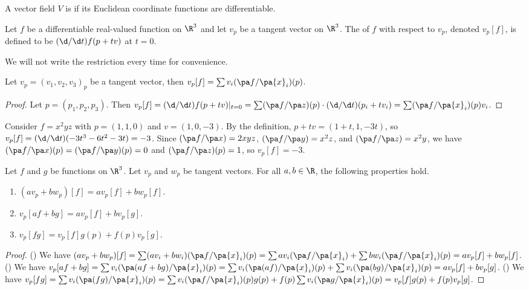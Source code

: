 \documentclass[10pt]{article}
\begin{document}
\begin{definition}
    A vector field $V$ is  if its Euclidean coordinate functions are differentiable.
\end{definition}
\begin{definition}
    Let $f$ be a differentiable real-valued function on ${\R}^{3}$ and let ${v}_{p}$ be a tangent vector on ${\R}^{3}$. The  of $f$ with respect to ${v}_{p}$, denoted ${v}_{p}[f]$, is defined to be $(\d/\d t)f(p+tv)$ at $t=0$.
\end{definition}
\begin{remark}
    We will not write the restriction every time for convenience.
\end{remark}
\begin{proposition}
    Let ${v}_{p}={({v}_{1},{v}_{2},{v}_{3})}_{p}$ be a tangent vector, then ${v}_{p}[f]=\sum{v}_{i}(\pa f/\pa{x}_{i})(p)$.
\end{proposition}
\begin{proof}
    Let $p=({p}_{1},{p}_{2},{p}_{3})$. Then ${v}_{p}[f]=(\d/\d t)f(p+tv){\vert}_{t=0}=\sum(\pa f/\pa z)(p)\cdot(\d/\d t)({p}_{i}+t{v}_{i})=\sum(\pa f/\pa{x}_{i})(p){v}_{i}$.
\end{proof}
\begin{example}
    Consider $f={x}^{2}yz$ with $p=(1,1,0)$ and $v=(1,0,-3)$. By the definition, $p+tv=(1+t,1,-3t)$, so ${v}_{p}[f]=(\d/\d t)(-3{t}^{3}-6{t}^{2}-3t)=-3$. Since $(\pa f/\pa x)=2xyz$, $(\pa f/\pa y)={x}^{2}z$, and $(\pa f/\pa z)={x}^{2}y$, we have $(\pa f/\pa x)(p)=(\pa f/\pa y)(p)=0$ and $(\pa f/\pa z)(p)=1$, so ${v}_{p}[f]=-3$.
\end{example}
\begin{proposition}
    Let $f$ and $g$ be functions on ${\R}^{3}$. Let ${v}_{p}$ and ${w}_{p}$ be tangent vectors. For all $a,b\in\R$, the following properties hold.
    \begin{enumerate}
        \item $(a{v}_{p}+b{w}_{p})[f]=a{v}_{p}[f]+b{w}_{p}[f]$.
        \item ${v}_{p}[af+bg]=a{v}_{p}[f]+b{v}_{p}[g]$.
        \item ${v}_{p}[fg]={v}_{p}[f]g(p)+f(p){v}_{p}[g]$.
    \end{enumerate}
\end{proposition}
\begin{proof}
    () We have $(a{v}_{p}+b{w}_{p})[f]=\sum(a{v}_{i}+b{w}_{i})(\pa f/\pa{x}_{i})(p)=\sum a{v}_{i}(\pa f/\pa{x}_{i})+\sum b{w}_{i}(\pa f/\pa{x}_{i})(p)=a{v}_{p}[f]+b{w}_{p}[f]$. () We have ${v}_{p}[af+bg]=\sum{v}_{i}(\pa(af+bg)/\pa{x}_{i})(p)=\sum{v}_{i}(\pa(af)/\pa{x}_{i})(p)+\sum{v}_{i}(\pa(bg)/\pa{x}_{i})(p)=a{v}_{p}[f]+b{v}_{p}[g]$. () We have ${v}_{p}[fg]=\sum{v}_{i}(\pa(fg)/\pa{x}_{i})(p)=\sum{v}_{i}(\pa f/\pa{x}_{i})(p)g(p)+f(p)\sum{v}_{i}(\pa g/\pa{x}_{i})(p)={v}_{p}[f]g(p)+f(p){v}_{p}[g]$.
\end{proof}
\end{document}

